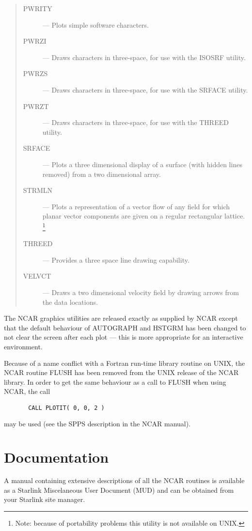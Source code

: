 \documentclass[twoside,11pt]{article}
\newcommand{\xlabel}[1]{}
\renewcommand{\_}{\texttt{\symbol{95}}}
\begin{document}
\begin{quote}
\begin{description}
\item [PWRITY] --- 
 Plots simple software characters.
\item [PWRZI] --- 
 Draws characters in three-space, for use with the ISOSRF utility.
\item [PWRZS] --- 
 Draws characters in three-space, for use with the SRFACE utility.
\item [PWRZT] --- 
 Draws characters in three-space, for use with the THREED utility.
\item [SRFACE] --- 
 Plots a three dimensional display of a surface (with hidden lines removed)
 from a two dimensional array.
\item [STRMLN] --- 
 Plots a representation of a vector flow of any field for which planar vector
 components are given on a regular rectangular lattice.
 \footnote{Note: because of portability problems this utility is not available
 on UNIX.}
\item [THREED] --- 
 Provides a three space line drawing capability.
\item [VELVCT] --- 
 Draws a two dimensional velocity field by drawing arrows from the data
 locations.
\end{description}
\end{quote}

The NCAR graphics utilities are released exactly as supplied by NCAR except
that the default behaviour of AUTOGRAPH and HSTGRM has been changed to not
clear the screen after each plot --- this is more appropriate for an
interactive environment. 

Because of a name conflict with a Fortran run-time library routine on
UNIX, the NCAR routine FLUSH has been removed from the UNIX release of
the NCAR library.  In order to get the same behaviour as a call to
FLUSH when using NCAR, the call

\begin{verbatim}
       CALL PLOTIT( 0, 0, 2 )
\end{verbatim}

may be used (see the SPPS description in the NCAR manual).


\section{\xlabel{documentation}Documentation}

A manual containing extensive descriptions of all the NCAR routines
is available as a Starlink Miscelaneous User Document (MUD) and can be 
obtained from your Starlink site manager. 
\end{document}
